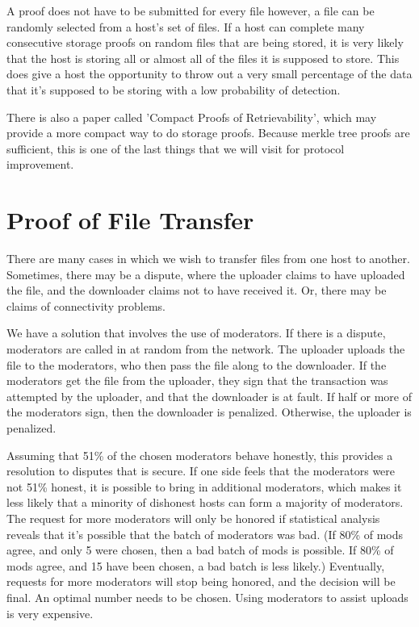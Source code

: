 \documentclass[twocolumn]{article}
\begin{document}
A proof does not have to be submitted for every file however, a file can be randomly selected from a host's set of files.
If a host can complete many consecutive storage proofs on random files that are being stored, it is very likely that the host is storing all or almost all of the files it is supposed to store.
This does give a host the opportunity to throw out a very small percentage of the data that it's supposed to be storing with a low probability of detection.

There is also a paper called 'Compact Proofs of Retrievability', which may provide a more compact way to do storage proofs.
Because merkle tree proofs are sufficient, this is one of the last things that we will visit for protocol improvement.

\section{Proof of File Transfer}
There are many cases in which we wish to transfer files from one host to another.
Sometimes, there may be a dispute, where the uploader claims to have uploaded the file, and the downloader claims not to have received it.
Or, there may be claims of connectivity problems.

We have a solution that involves the use of moderators.
If there is a dispute, moderators are called in at random from the network.
The uploader uploads the file to the moderators, who then pass the file along to the downloader.
If the moderators get the file from the uploader, they sign that the transaction was attempted by the uploader, and that the downloader is at fault.
If half or more of the moderators sign, then the downloader is penalized.
Otherwise, the uploader is penalized.

Assuming that 51\% of the chosen moderators behave honestly, this provides a resolution to disputes that is secure.
If one side feels that the moderators were not 51\% honest, it is possible to bring in additional moderators, which makes it less likely that a minority of dishonest hosts can form a majority of moderators.
The request for more moderators will only be honored if statistical analysis reveals that it's possible that the batch of moderators was bad. (If 80\% of mods agree, and only 5 were chosen, then a bad batch of mods is possible. If 80\% of mods agree, and 15 have been chosen, a bad batch is less likely.)
Eventually, requests for more moderators will stop being honored, and the decision will be final.
An optimal number needs to be chosen.
Using moderators to assist uploads is very expensive.
\end{document}
